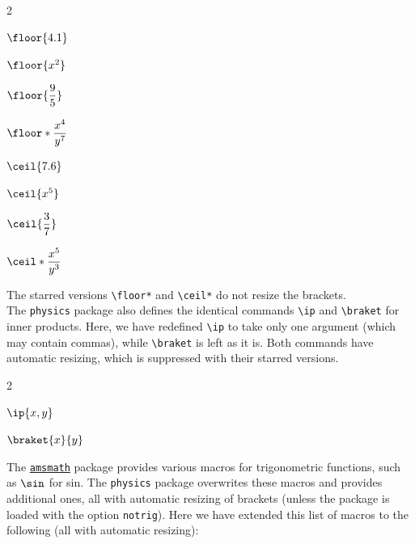 \documentclass{article}
\begin{document}
{\begin{multicols}{2}
\begin{verbbox}[righthand width=3cm]
$\floor{4.1}$
\end{verbbox}
\begin{verbbox}[righthand width=3cm]
$\floor{x^2}$
\end{verbbox}
\begin{verbbox}[righthand width=3cm]
$\floor{\dfrac{9}{5}}$
\end{verbbox}
\begin{verbbox}[righthand width=3cm]
$\floor*{\dfrac{x^4}{y^7}}$
\end{verbbox}
\begin{verbbox}[righthand width=3cm]
$\ceil{7.6}$
\end{verbbox}
\begin{verbbox}[righthand width=3cm]
$\ceil{x^5}$
\end{verbbox}
\begin{verbbox}[righthand width=3cm]
$\ceil{\dfrac{3}{7}}$
\end{verbbox}
\begin{verbbox}[righthand width=3cm]
$\ceil*{\dfrac{x^5}{y^3}}$
\end{verbbox}
\end{multicols}

The starred versions \verb!\floor*! and \verb!\ceil*! do not resize the brackets.\\

The \texttt{physics} package also defines the identical commands \verb!\ip! and \verb!\braket! for inner products. Here, we have redefined \verb!\ip! to take only one argument (which may contain commas), while \verb!\braket! is left as it is. Both commands have automatic resizing, which is suppressed with their starred versions.

\begin{multicols}{2}
\begin{verbbox}
$\ip{x,y}$
\end{verbbox}
\begin{verbbox}
$\braket{x}{y}$
\end{verbbox}
\end{multicols}

The \href{https://ctan.org/pkg/amsmath}{\texttt{amsmath}} package provides various macros for trigonometric functions, such as $\verb!\sin!$ for sin. The \texttt{physics} package overwrites these macros and provides additional ones, all with automatic resizing of brackets (unless the package is loaded with the option \texttt{notrig}). Here we have extended this list of macros to the following (all with automatic resizing):

}
\end{document}
